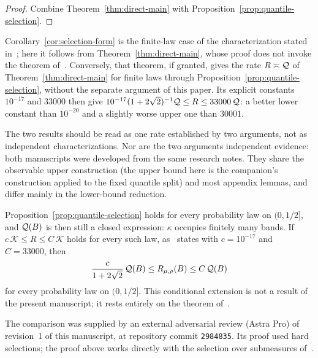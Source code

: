 \begin{proof}
Combine Theorem~\ref{thm:direct-main} with
Proposition~\ref{prop:quantile-selection}.
\end{proof}

Corollary~\ref{cor:selection-form} is the finite-law case of the
characterization stated in~\cite{gl}; here it follows from
Theorem~\ref{thm:direct-main}, whose proof does not invoke the theorem
of~\cite{gl}. Conversely, that theorem, if granted, gives the rate
$R\asymp\mathcal Q$ of Theorem~\ref{thm:direct-main} for finite laws through
Proposition~\ref{prop:quantile-selection}, without the separate argument
of this paper. Its explicit constants $10^{-17}$ and $33000$ then give
$10^{-17}(1+2\sqrt2)^{-1}\mathcal Q\le R\le33000\,\mathcal Q$: a better lower constant
than $10^{-20}$ and a slightly worse upper one than $30001$.

The two results should be read as one rate established by two
arguments, not as independent characterizations. Nor are the two
arguments independent evidence: both manuscripts were developed from
the same research notes. They share the observable upper construction
(the upper bound here is the companion's construction applied to the
fixed quantile split) and most appendix lemmas, and differ mainly in the
lower-bound reduction.

\begin{remark}\label{rem:general-laws}
Proposition~\ref{prop:quantile-selection} holds for every probability
law on $(0,1/2]$, and $\mathcal Q(B)$ is then still a closed expression: $\kappa$
occupies finitely many bands. If $c\,\mathcal K\le R\le C\,\mathcal K$
holds for every such law, as~\cite{gl} states with $c=10^{-17}$ and
$C=33000$, then
\[
 \frac{c}{1+2\sqrt2}\,\mathcal Q(B)\le R_{\mu,\rho}(B)\le C\,\mathcal Q(B)
\]
for every probability law on $(0,1/2]$. This conditional extension is
not a result of the present manuscript; it rests entirely on the
theorem of~\cite{gl}.
\end{remark}

The comparison was supplied by an external adversarial review (Astra
Pro) of revision~1 of this manuscript, at repository commit
\texttt{2984835}. Its proof used hard selections; the proof above
works directly with the selection over submeasures of~\cite{gl}.
